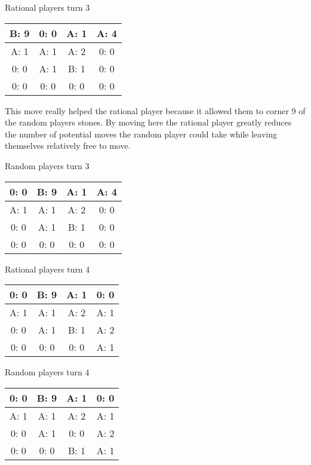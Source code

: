 \documentclass[12pt]{article}
\begin{document}
Rational players turn 3
\begin{center}
\begin{tabular}{|c|c|c|c|}
\hline
B: 9  & 0: 0  & A: 1  & A: 4  \\ \hline
A: 1  & A: 1  & A: 2  & 0: 0  \\ \hline
0: 0  & A: 1  & B: 1  & 0: 0  \\ \hline
0: 0  & 0: 0  & 0: 0  & 0: 0  \\ \hline
\end{tabular}
\end{center}
This move really helped the rational player because it allowed them to corner 9 of the random players stones. By moving here the rational player greatly reduces the number of potential moves the random player could take while leaving themselves relatively free to move.

Random players turn 3
\begin{center}
\begin{tabular}{|c|c|c|c|}
\hline
0: 0  & B: 9  & A: 1  & A: 4  \\ \hline
A: 1  & A: 1  & A: 2  & 0: 0  \\ \hline
0: 0  & A: 1  & B: 1  & 0: 0  \\ \hline
0: 0  & 0: 0  & 0: 0  & 0: 0  \\ \hline
\end{tabular}
\end{center}

Rational players turn 4
\begin{center}
\begin{tabular}{|c|c|c|c|}
\hline
0: 0  & B: 9  & A: 1  & 0: 0  \\ \hline
A: 1  & A: 1  & A: 2  & A: 1  \\ \hline
0: 0  & A: 1  & B: 1  & A: 2  \\ \hline
0: 0  & 0: 0  & 0: 0  & A: 1  \\ \hline
\end{tabular}
\end{center}
Random players turn 4
\begin{center}
\begin{tabular}{|c|c|c|c|}
\hline
0: 0  & B: 9  & A: 1  & 0: 0  \\ \hline
A: 1  & A: 1  & A: 2  & A: 1  \\ \hline
0: 0  & A: 1  & 0: 0  & A: 2  \\ \hline
0: 0  & 0: 0  & B: 1  & A: 1  \\ \hline
\end{tabular}
\end{center}
\end{document}
